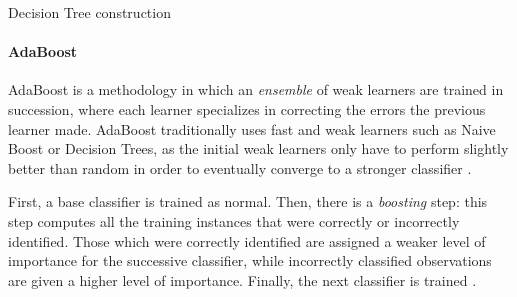 \begin{algorithm}[ht]




\caption{Decision Tree construction \cite{liu2007web}}
\end{algorithm}

\paragraph{AdaBoost} \label{sec:adaboost}

AdaBoost is a methodology in which an \textit{ensemble} of weak learners are trained in succession, where each learner specializes in correcting the errors the previous learner made. AdaBoost traditionally uses fast and weak learners such as Naive Boost or Decision Trees, as the initial weak learners only have to perform slightly better than random in order to eventually converge to a stronger classifier \cite{liu2007web}.

First, a base classifier is trained as normal. Then, there is a \textit{boosting} step: this step computes all the training instances that were correctly or incorrectly identified. Those which were correctly identified are assigned a weaker level of importance for the successive classifier, while incorrectly classified observations are given a higher level of importance. Finally, the next classifier is trained \cite{adaboost}. 

